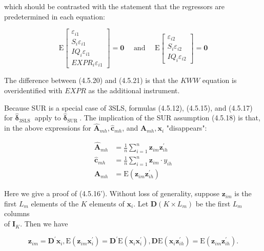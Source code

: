 \documentclass[10pt]{article}
\begin{document}
which should be contrasted with the statement that the regressors are predetermined in each equation:

\[
\mathrm{E}\left[\begin{array}{c}
\varepsilon_{i 1}  \tag{4.5.21}\\
S_{i} \varepsilon_{i 1} \\
I Q_{i} \varepsilon_{i 1} \\
E X P R_{i} \varepsilon_{i 1}
\end{array}\right]=\mathbf{0} \quad \text { and } \quad \mathrm{E}\left[\begin{array}{c}
\varepsilon_{i 2} \\
S_{i} \varepsilon_{i 2} \\
I Q_{i} \varepsilon_{i 2}
\end{array}\right]=\mathbf{0}
\]

The difference between (4.5.20) and (4.5.21) is that the $K W W$ equation is overidentified with $E X P R$ as the additional instrument.

Because SUR is a special case of 3SLS, formulas (4.5.12), (4.5.15), and (4.5.17) for $\hat{\boldsymbol{\delta}}_{\text {3SLS }}$ apply to $\hat{\boldsymbol{\delta}}_{\text {SUR }}$. The implication of the SUR assumption (4.5.18) is that, in the above expressions for $\widehat{\mathbf{A}}_{m h}, \hat{\mathbf{c}}_{m h}$, and $\mathbf{A}_{m h}, \mathbf{x}_{i}$ "disappears":


\begin{align*}
\widehat{\mathbf{A}}_{m h} & =\frac{1}{n} \sum_{i=1}^{n} \mathbf{z}_{i m} \mathbf{z}_{i h}^{\prime}  \tag{$\prime$}\\
\hat{\mathbf{c}}_{m h} & =\frac{1}{n} \sum_{i=1}^{n} \mathbf{z}_{i m} \cdot y_{i h}  \tag{$\prime$}\\
\mathbf{A}_{m h} & =\mathrm{E}\left(\mathbf{z}_{i m} \mathbf{z}_{i h}^{\prime}\right) \tag{4.5.16'}
\end{align*}


Here we give a proof of (4.5.16'). Without loss of generality, suppose $\mathbf{z}_{i m}$ is the first $L_{m}$ elements of the $K$ elements of $\mathbf{x}_{i}$. Let $\mathbf{D}\left(K \times L_{m}\right)$ be the first $L_{m}$ columns\\
of $\mathbf{I}_{K}$. Then we have

$$
\mathbf{z}_{i m}=\mathbf{D}^{\prime} \mathbf{x}_{i}, \mathrm{E}\left(\mathbf{z}_{i m} \mathbf{x}_{i}^{\prime}\right)=\mathbf{D}^{\prime} \mathrm{E}\left(\mathbf{x}_{i} \mathbf{x}_{i}^{\prime}\right), \mathbf{D} \mathrm{E}\left(\mathbf{x}_{i} \mathbf{z}_{i h}^{\prime}\right)=\mathrm{E}\left(\mathbf{z}_{i m} \mathbf{z}_{i h}^{\prime}\right) .
$$
\end{document}

